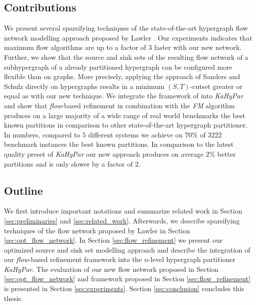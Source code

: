 \subsection{Contributions}

We present several sparsifying techniques of the state-of-the-art hypergraph flow network
modelling approach proposed by Lawler \cite{lawler1973}. Our experiments indicates that
maximum flow algorithms are up to a factor of $3$ faster with our new network. Further, 
we show that the source and sink sets of the resulting flow network of a subhypergraph 
of a already partitioned hypergraph can be configured more flexible than on graphs. More 
precisely, applying the approach of Sanders and Schulz \cite{sanders2011engineering}
directly on hypergraphs results in a minimum $(S,T)$-cutset greater or equal as with
our new technique. We integrate the framework of \cite{sanders2011engineering} into 
\emph{KaHyPar} and show that \emph{flow}-based refinement in combination with the
\emph{FM} algorithm produces on a large majority of a wide range of real world
benchmarks the best known partitions in comparison to other state-of-the-art hypergraph
partitioner. In numbers, compared to $5$ different systems we achieve on $70\%$ 
of $3222$ benchmark instances the best known partitions. In comparison to the 
latest quality preset of \emph{KaHyPar} our new approach produces on average $2\%$ better 
partitions and is only slower by a factor of $2$.

\subsection{Outline}

We first introduce important notations and summarize related work in Section \ref{sec:preliminaries}
and \ref{sec:related_work}. Afterwards, we describe sparsifying techniques of the flow network
proposed by Lawler \cite{lawler1973} in Section \ref{sec:opt_flow_network}. In Section
\ref{sec:flow_refinement} we present our optimized source and sink set modelling
approach and describe the integration of our \emph{flow}-based refinement framework into
the $n$-level hypergraph partitioner \emph{KaHyPar}. The evaluation of our new flow network
proposed in Section \ref{sec:opt_flow_network} and framework proposed in Section 
\ref{sec:flow_refinement} is presented in Section \ref{sec:experiments}. 
Section \ref{sec:conclusion} concludes this thesis.